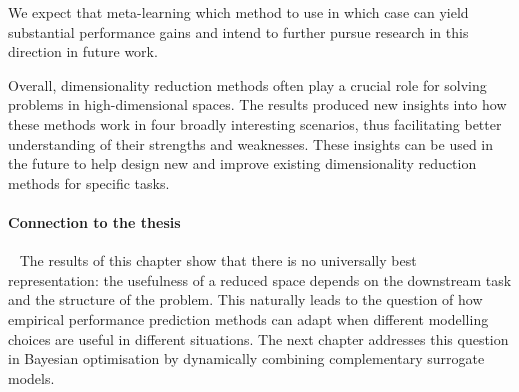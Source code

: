 We expect that meta-learning which method to use in which case can yield substantial performance gains and intend to further pursue research in this direction in future work.








Overall, dimensionality reduction methods often play a crucial role for solving problems in high-dimensional spaces. 
The results produced new insights into how these methods work in four broadly interesting scenarios, thus facilitating better understanding of their strengths and weaknesses.
These insights can be used in the future to help design new and improve existing dimensionality reduction methods for specific tasks.

\paragraph{Connection to the thesis}~
The results of this chapter show that there is no universally best representation: the usefulness of a reduced space depends on the downstream task and the structure of the problem.
This naturally leads to the question of how empirical performance prediction methods can adapt when different modelling choices are useful in different situations.
The next chapter addresses this question in Bayesian optimisation by dynamically combining complementary surrogate models.
